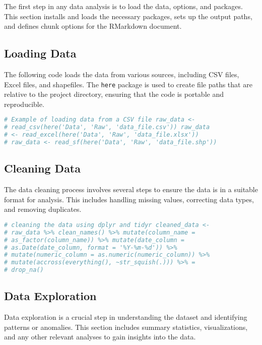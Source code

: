 \documentclass[
  12pt,
]{article}
\newcommand{\passthrough}[1]{#1}
\begin{document}
The first step in any data analysis is to load the data, options, and
packages. This section installs and loads the necessary packages, sets
up the output paths, and defines chunk options for the RMarkdown
document.

\subsection{Loading Data}\label{loading-data}

The following code loads the data from various sources, including CSV
files, Excel files, and shapefiles. The \passthrough{\lstinline!here!}
package is used to create file paths that are relative to the project
directory, ensuring that the code is portable and reproducible.

\begin{lstlisting}[language=R]
# Example of loading data from a CSV file raw_data <-
# read_csv(here('Data', 'Raw', 'data_file.csv')) raw_data
# <- read_excel(here('Data', 'Raw', 'data_file.xlsx'))
# raw_data <- read_sf(here('Data', 'Raw', 'data_file.shp'))
\end{lstlisting}

\subsection{Cleaning Data}\label{cleaning-data}

The data cleaning process involves several steps to ensure the data is
in a suitable format for analysis. This includes handling missing
values, correcting data types, and removing duplicates.

\begin{lstlisting}[language=R]
# cleaning the data using dplyr and tidyr cleaned_data <-
# raw_data %>% clean_names() %>% mutate(column_name =
# as_factor(column_name)) %>% mutate(date_column =
# as.Date(date_column, format = '%Y-%m-%d')) %>%
# mutate(numeric_column = as.numeric(numeric_column)) %>%
# mutate(accross(everything(), ~str_squish(.))) %>% =
# drop_na()
\end{lstlisting}

\subsection{Data Exploration}\label{data-exploration}

Data exploration is a crucial step in understanding the dataset and
identifying patterns or anomalies. This section includes summary
statistics, visualizations, and any other relevant analyses to gain
insights into the data.
\end{document}
